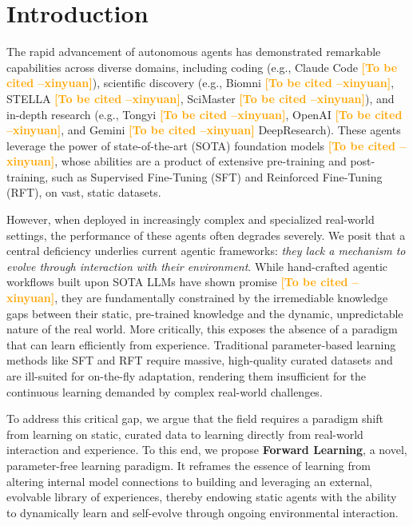 \documentclass{article}
\newcommand{\method}{Forward Learning}
\newcommand{\xinyuan}[1]{\textcolor{orange}{\bf \small [#1 --xinyuan]}}
\begin{document}
\section{Introduction}
The rapid advancement of autonomous agents has demonstrated remarkable capabilities across diverse domains, including coding (e.g., Claude Code \xinyuan{To be cited}), scientific discovery (e.g., Biomni \xinyuan{To be cited}, STELLA \xinyuan{To be cited}, SciMaster \xinyuan{To be cited}), and in-depth research (e.g., Tongyi \xinyuan{To be cited}, OpenAI \xinyuan{To be cited}, and Gemini \xinyuan{To be cited} DeepResearch). These agents leverage the power of state-of-the-art (SOTA) foundation models \xinyuan{To be cited}, whose abilities are a product of extensive pre-training and post-training, such as Supervised Fine-Tuning (SFT) and Reinforced Fine-Tuning (RFT), on vast, static datasets.

However, when deployed in increasingly complex and specialized real-world settings, the performance of these agents often degrades severely. We posit that a central deficiency underlies current agentic frameworks: \textit{they lack a mechanism to evolve through interaction with their environment}. While hand-crafted agentic workflows built upon SOTA LLMs have shown promise \xinyuan{To be cited}, they are fundamentally constrained by the irremediable knowledge gaps between their static, pre-trained knowledge and the dynamic, unpredictable nature of the real world. More critically, this exposes the absence of a paradigm that can learn efficiently from experience. Traditional parameter-based learning methods like SFT and RFT require massive, high-quality curated datasets and are ill-suited for on-the-fly adaptation, rendering them insufficient for the continuous learning demanded by complex real-world challenges.

To address this critical gap, we argue that the field requires a paradigm shift from learning on static, curated data to learning directly from real-world interaction and experience. To this end, we propose \textbf{\method{}}, a novel, parameter-free learning paradigm. It reframes the essence of learning from altering internal model connections to building and leveraging an external, evolvable library of experiences, thereby endowing static agents with the ability to dynamically learn and self-evolve through ongoing environmental interaction.
\end{document}
